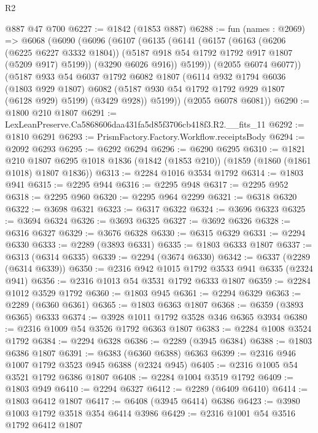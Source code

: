 \begin{lexlean}{R2}
\begin{coremodule}
    @887
    @47
    @700
@6227 := @1842 (@1853 @887)
@6288 := fun (names : @2069) =>
  @6068
    (@6090
      (@6096
        (@6107
          (@6135
            (@6141
              (@6157
                (@6163
                  (@6206 (@6225 @6227 @3332 @1804))
                  (@5187 @918 @54 @1792 @1792 @917 @1807 (@5209 @917) @5199))
                (@3290 @6026 @916))
              @5199))
          (@2055 @6074 @6077))
        (@5187
          @933
          @54
          @6037
          @1792
          @6082
          @1807
          (@6114
            @932
            @1794
            @6036
            (@1803 @929 @1807)
            @6082
            (@5187 @930 @54 @1792 @1792 @929 @1807 (@6128 @929) @5199)
            (@3429 @928))
          @5199))
      (@2055 @6078 @6081))
@6290 := @1800 @210 @1807
@6291 := LexLeanPreserve.Ca5868606daa431fa5d85f3706cb418f3.R2.__fits_11
@6292 := @1810 @6291
@6293 := PrismFactory.Factory.Workflow.receiptsBody
@6294 := @2092 @6293
@6295 := @6292 @6294
@6296 := @6290 @6295
@6310 := @1821
    @210
    @1807
    @6295
    @1018
    @1836
    (@1842 (@1853 @210))
    (@1859 (@1860 (@1861 @1018) @1807 @1836))
@6313 := @2284 @1016 @3534 @1792
@6314 := @1803 @941
@6315 := @2295 @944
@6316 := @2295 @948
@6317 := @2295 @952
@6318 := @2295 @960
@6320 := @2295 @964 @2299
@6321 := @6318 @6320
@6322 := @3698 @6321
@6323 := @6317 @6322
@6324 := @3696 @6323
@6325 := @3694 @6324
@6326 := @3693 @6325
@6327 := @3692 @6326
@6328 := @6316 @6327
@6329 := @3676 @6328
@6330 := @6315 @6329
@6331 := @2294 @6330
@6333 := @2289 (@3893 @6331)
@6335 := @1803 @6333 @1807
@6337 := @6313 (@6314 @6335)
@6339 := @2294 (@3674 @6330)
@6342 := @6337 (@2289 (@6314 @6339))
@6350 := @2316 @942 @1015 @1792 @3533 @941 @6335 (@2324 @941)
@6356 := @2316 @1013 @54 @3531 @1792 @6333 @1807
@6359 := @2284 @1012 @3529 @1792
@6360 := @1803 @945
@6361 := @2294 @6329
@6363 := @2289 (@6360 @6361)
@6365 := @1803 @6363 @1807
@6368 := @6359 (@3893 @6365) @6333
@6374 := @3928 @1011 @1792 @3528 @346 @6365 @3934
@6380 := @2316 @1009 @54 @3526 @1792 @6363 @1807
@6383 := @2284 @1008 @3524 @1792
@6384 := @2294 @6328
@6386 := @2289 (@3945 @6384)
@6388 := @1803 @6386 @1807
@6391 := @6383 (@6360 @6388) @6363
@6399 := @2316 @946 @1007 @1792 @3523 @945 @6388 (@2324 @945)
@6405 := @2316 @1005 @54 @3521 @1792 @6386 @1807
@6408 := @2284 @1004 @3519 @1792
@6409 := @1803 @949
@6410 := @2294 @6327
@6412 := @2289 (@6409 @6410)
@6414 := @1803 @6412 @1807
@6417 := @6408 (@3945 @6414) @6386
@6423 := @3980 @1003 @1792 @3518 @354 @6414 @3986
@6429 := @2316 @1001 @54 @3516 @1792 @6412 @1807

\end{coremodule}
\end{lexlean}
